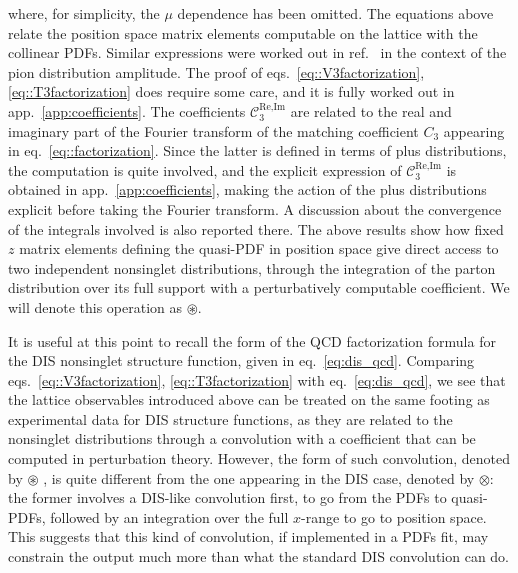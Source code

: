 where, for simplicity, the $\mu$ dependence has been omitted. 
The equations above relate the position space matrix elements computable on the lattice with
the collinear PDFs. Similar expressions were worked out in ref.~\cite{Bali:2017gfr} in the context of
the pion distribution amplitude.   
The proof of eqs.~\eqref{eq::V3factorization}, \eqref{eq::T3factorization} does require some
care, and it is fully worked out in app.~\ref{app:coefficients}. The coefficients $\mathcal{C}_3^{\text{Re},\text{Im}}$
are related to the real and imaginary part of the Fourier transform of the matching coefficient 
$C_3$ appearing in eq.~\eqref{eq::factorization}. Since the latter is defined in terms of plus distributions,
the computation is quite involved, and the explicit expression of $\mathcal{C}_3^{\text{Re},\text{Im}}$
is obtained in app.~\ref{app:coefficients}, making the action of the plus distributions explicit before taking the Fourier transform.  
A discussion about the convergence of the
integrals involved is also reported there. The above results show how fixed $z$
matrix elements defining the quasi-PDF in position space give direct access to
two independent nonsinglet distributions, through the integration of the parton
distribution over its full support with a perturbatively computable coefficient.
We will denote this operation as $\circledast$. 

It is useful at this point to recall the form of the QCD factorization formula
for the DIS nonsinglet structure function, given in eq.~\eqref{eq:dis_qcd}.
Comparing eqs.~\eqref{eq::V3factorization}, \eqref{eq::T3factorization}  with
eq.~\eqref{eq:dis_qcd}, we see that the lattice observables introduced
above can be treated on the same footing as experimental data for DIS structure
functions, as they are related to the nonsinglet distributions through a
convolution with a coefficient that can be computed in perturbation theory.
%
However, the form of such convolution, denoted by $\circledast$ , is quite
different from the one appearing in the DIS case, denoted by $\otimes$: the
former involves a DIS-like convolution first, to go from the PDFs to quasi-PDFs,
followed by an integration over the full $x$-range to go to position space. This
suggests that this kind of convolution, if implemented in a PDFs fit, may
constrain the output much more than what the standard DIS convolution can do. 

